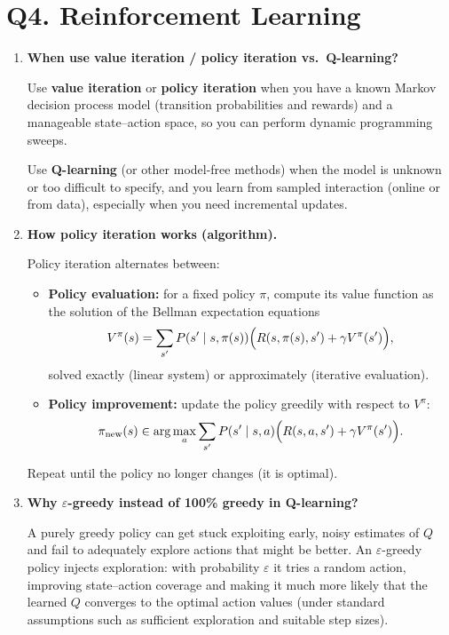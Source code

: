 \documentclass[11pt]{article}
\begin{document}
\section*{Q4. Reinforcement Learning}

\begin{enumerate}[label=(\alph*)]

\item \textbf{When use value iteration / policy iteration vs.\ Q-learning?}

Use \textbf{value iteration} or \textbf{policy iteration} when you have a known Markov decision process model (transition probabilities and rewards) and a manageable state--action space, so you can perform dynamic programming sweeps.

Use \textbf{Q-learning} (or other model-free methods) when the model is unknown or too difficult to specify, and you learn from sampled interaction (online or from data), especially when you need incremental updates.

\item \textbf{How policy iteration works (algorithm).}

Policy iteration alternates between:
\begin{itemize}
\item \textbf{Policy evaluation:} for a fixed policy $\pi$, compute its value function as the solution of the Bellman expectation equations
\[
V^\pi(s)=\sum_{s'}P(s'\mid s,\pi(s))\Bigl(R(s,\pi(s),s')+\gamma V^\pi(s')\Bigr),
\]
solved exactly (linear system) or approximately (iterative evaluation).
\item \textbf{Policy improvement:} update the policy greedily with respect to $V^\pi$:
\[
\pi_{\text{new}}(s)\in\arg\max_{a}\sum_{s'}P(s'\mid s,a)\Bigl(R(s,a,s')+\gamma V^\pi(s')\Bigr).
\]
\end{itemize}
Repeat until the policy no longer changes (it is optimal).

\item \textbf{Why $\varepsilon$-greedy instead of 100\% greedy in Q-learning?}

A purely greedy policy can get stuck exploiting early, noisy estimates of $Q$ and fail to adequately explore actions that might be better. An $\varepsilon$-greedy policy injects exploration: with probability $\varepsilon$ it tries a random action, improving state--action coverage and making it much more likely that the learned $Q$ converges to the optimal action values (under standard assumptions such as sufficient exploration and suitable step sizes).


\end{enumerate}
\end{document}
